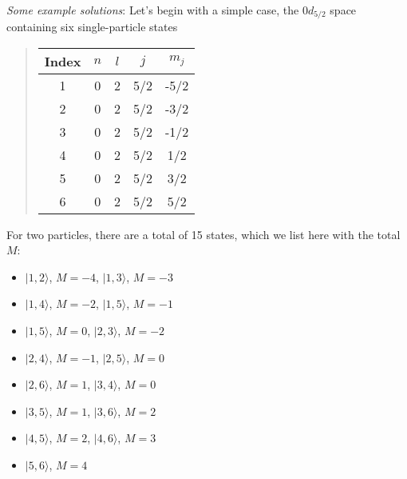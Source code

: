 \documentclass[%
twoside,                 %
final,                   %
10pt]{article}
\begin{document}
\paragraph{}

\emph{Some example solutions}:  Let's begin with a simple case, the $0d_{5/2}$ space containing six single-particle states


\begin{quote}
\begin{tabular}{ccccc}
\hline
\multicolumn{1}{c}{ Index } & \multicolumn{1}{c}{ $n$ } & \multicolumn{1}{c}{ $l$ } & \multicolumn{1}{c}{ $j$ } & \multicolumn{1}{c}{ $m_j$ } \\
\hline
1     & 0   & 2   & 5/2 & -5/2  \\
2     & 0   & 2   & 5/2 & -3/2  \\
3     & 0   & 2   & 5/2 & -1/2  \\
4     & 0   & 2   & 5/2 & 1/2   \\
5     & 0   & 2   & 5/2 & 3/2   \\
6     & 0   & 2   & 5/2 & 5/2   \\
\hline
\end{tabular}
\end{quote}

\noindent
For two particles, there are a total of 15 states, which we list here with the total $M$:
\begin{itemize}
\item $| 1,2 \rangle$, $M= -4$,  $| 1,3 \rangle$, $M= -3$

\item $| 1,4 \rangle$, $M= -2$, $| 1,5 \rangle$, $M= -1$

\item $| 1,5 \rangle$, $M= 0$, $| 2,3 \rangle$, $M= -2$

\item $| 2,4 \rangle$, $M= -1$, $| 2,5 \rangle$, $M= 0$

\item $| 2,6 \rangle$, $M= 1$, $| 3,4 \rangle$, $M= 0$

\item $| 3,5 \rangle$, $M= 1$, $| 3,6 \rangle$, $M= 2$

\item $| 4,5 \rangle$, $M= 2$, $ | 4,6 \rangle$, $M= 3$

\item $| 5,6 \rangle$, $M= 4$
\end{itemize}
\end{document}
